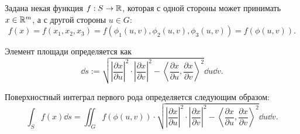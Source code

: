 Задана некая функция $f: S \to \mathbb{R}$, которая с одной стороны может принимать $x \in \mathbb{R}^m$, а с другой стороны $u \in G$:
\begin{equation*}
    f(x) = f(x_1, x_2, x_3) = f(\phi_1(u, v), \phi_2(u, v), \phi_3(u, v)) = f(\phi(u, v)).
\end{equation*}

\begin{definition*}
    Элемент площади определяется как
    \begin{equation*}
        \dd s := \sqrt{
        \left|\frac{\partial x}{\partial u}\right|^2 \cdot \left|\frac{\partial x}{\partial v}\right|^2 - \left\langle \frac{\partial x}{\partial u}, \frac{\partial x}{\partial v}\right\rangle ^2
        } \dd u \dd v.
    \end{equation*}

    Поверхностный интеграл первого рода определяется следующим образом:
    \begin{equation*}
        \int_S f(x) \dd s 
        = 
        \iint_G f(\phi(u, v)) \cdot \sqrt{\left|\frac{\partial x}{\partial u}\right|^2 \cdot \left|\frac{\partial x}{\partial v}\right|^2 - \left\langle \frac{\partial x}{\partial u}, \frac{\partial x}{\partial v}\right\rangle ^2} \dd u \dd v.
    \end{equation*}
\end{definition*}
